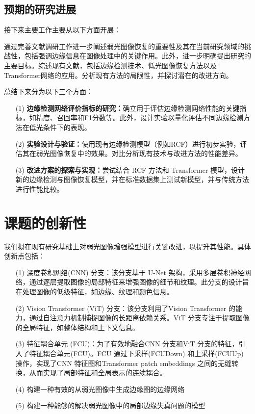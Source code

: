 \documentclass[a4paper]{ctexart}
\begin{document}
	\subsection{预期的研究进展}
	
	接下来主要工作主要从以下方面开展：
	
	通过完善文献调研工作进一步阐述弱光图像恢复的重要性及其在当前研究领域的挑战性，包括强调边缘信息在图像处理中的关键作用。此外，进一步明确提出研究的主要目标。综述现有文献，包括边缘检测技术、低光图像恢复方法以及Transformer网络的应用。分析现有方法的局限性，并探讨潜在的改进方向。
	
	总结下来分为以下三个方面：
	\begin{itemize}
		\item[(1)] \textbf{边缘检测网络评价指标的研究：}确立用于评估边缘检测网络性能的关键指标，如精度、召回率和F1分数等。此外，设计实验以量化评估不同边缘检测方法在低光条件下的表现。
		
		\item[(2)] \textbf{实验设计与验证：}使用现有边缘检测模型（例如RCF）进行初步实验，评估其在弱光图像恢复中的效果。对比分析现有技术与改进方法的性能差异。
		
		\item[(3)] \textbf{改进方案的探索与实现：}尝试结合 RCF 方法和 Transformer 模型，设计新的边缘检测与图像恢复模型，并在标准数据集上测试新模型，并与传统方法进行性能比较。
	\end{itemize}
	
	\section{课题的创新性}
	
	我们拟在现有研究基础上对弱光图像增强模型进行关键改进，以提升其性能。具体创新点包括：
	
	\begin{itemize}
		\item [(1)] 深度卷积网络(CNN) 分支：该分支基于 U-Net 架构，采用多层卷积神经网络，通过逐层提取图像的局部特征来增强图像的细节和纹理。此分支的设计旨在处理图像的低级特征，如边缘、纹理和颜色信息。
		
		\item [(2)] Vision Transformer (ViT) 分支：该分支利用了Vision Transformer 的能力，通过自注意力机制捕捉图像的长距离依赖关系。ViT 分支专注于提取图像的全局特征，如整体结构和上下文信息。
		
		\item [(3)] 特征耦合单元 (FCU)：为了有效地融合CNN 分支和ViT 分支的特征，引入了特征耦合单元(FCU)。FCU 通过下采样(FCUDown) 和上采样(FCUUp) 操作，实现了CNN 特征图和Transformer patch embeddings 之间的无缝转换，从而实现了局部特征和全局表示的连续耦合。
		
		\item [(4)] 构建一种有效的从弱光图像中生成边缘图的边缘网络
		
		\item [(5)] 构建一种能够的解决弱光图像中的局部边缘失真问题的模型
	\end{itemize}
	
\end{document}
